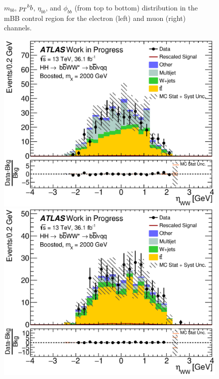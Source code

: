 \begin{figure}[h]
\begin{center}
\caption[Kinematic distributions in the mBB control region for the electron and muon channels]{${m_{bb}}$, ${\pt^bb}$,  ${\eta_{bb}}$, and ${\phi_{bb}}$ (from top to bottom) distribution in the mBB control region for the electron (left) and muon (right) channels.}
\end{center}
\end{figure}

\newpage

\begin{figure}[h]
\begin{center}
\includegraphics[scale=0.33]{figures/kinplots/C_2tag_mbbcr_elec_presel_met50_WWEta}
\includegraphics[scale=0.33]{figures/kinplots/C_2tag_mbbcr_muon_presel_met50_WWEta}\\

\end{center}
\end{figure}

